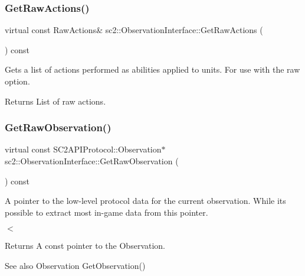 \subsubsection{\texorpdfstring{Get\+Raw\+Actions()}{GetRawActions()}}
{\footnotesize\ttfamily virtual const Raw\+Actions\& sc2\+::\+Observation\+Interface\+::\+Get\+Raw\+Actions (\begin{DoxyParamCaption}{ }\end{DoxyParamCaption}) const\hspace{0.3cm}{\ttfamily [pure virtual]}}

Gets a list of actions performed as abilities applied to units. For use with the raw option. \begin{DoxyReturn}{Returns}
List of raw actions. 
\end{DoxyReturn}
\mbox{\label{classsc2_1_1_observation_interface_a375edbd0639c948d8c83bdcd4ebd4932}} 
\subsubsection{\texorpdfstring{Get\+Raw\+Observation()}{GetRawObservation()}}
{\footnotesize\ttfamily virtual const S\+C2\+A\+P\+I\+Protocol\+::\+Observation$\ast$ sc2\+::\+Observation\+Interface\+::\+Get\+Raw\+Observation (\begin{DoxyParamCaption}{ }\end{DoxyParamCaption}) const\hspace{0.3cm}{\ttfamily [pure virtual]}}



A pointer to the low-\/level protocol data for the current observation. While it\textquotesingle{}s possible to extract most in-\/game data from this pointer. 

$<$ \begin{DoxyReturn}{Returns}
A const pointer to the Observation. 
\end{DoxyReturn}
\begin{DoxySeeAlso}{See also}
Observation Get\+Observation() 
\end{DoxySeeAlso}
\mbox{\label{classsc2_1_1_observation_interface_a3ced6a72078288c373ad04c72eb1fba7}} 
